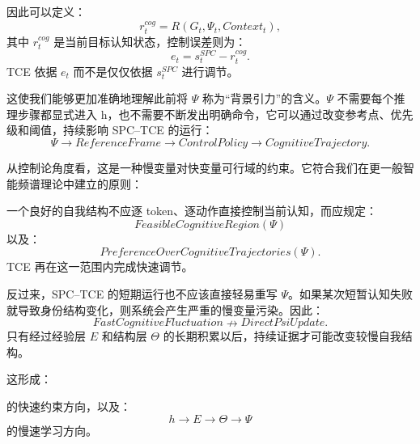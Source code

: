 因此可以定义：
\begin{equation}
r_t^{cog}
=
R
\left(
G_t,\Psi_t,Context_t
\right),
\end{equation}
其中 $r_t^{cog}$ 是当前目标认知状态，控制误差则为：
\begin{equation}
e_t
=
s_t^{SPC}
-
r_t^{cog}.
\end{equation}
TCE 依据 $e_t$ 而不是仅仅依据 $s_t^{SPC}$ 进行调节。

这使我们能够更加准确地理解此前将 $\Psi$ 称为``背景引力''的含义。$\Psi$ 不需要每个推理步骤都显式进入 h，也不需要不断发出明确命令，它可以通过改变参考点、优先级和阈值，持续影响 SPC--TCE 的运行：
\begin{equation}
\Psi
\rightarrow
ReferenceFrame
\rightarrow
ControlPolicy
\rightarrow
CognitiveTrajectory.
\end{equation}

从控制论角度看，这是一种慢变量对快变量可行域的约束。它符合我们在更一般智能频谱理论中建立的原则：
\begin{statementbox}
\centering
{}
\end{statementbox}

一个良好的自我结构不应逐 token、逐动作直接控制当前认知，而应规定：
\begin{equation}
FeasibleCognitiveRegion(\Psi)
\end{equation}
以及：
\begin{equation}
PreferenceOverCognitiveTrajectories(\Psi).
\end{equation}
TCE 再在这一范围内完成快速调节。

反过来，SPC--TCE 的短期运行也不应该直接轻易重写 $\Psi$。如果某次短暂认知失败就导致身份结构变化，则系统会产生严重的慢变量污染。因此：
\begin{equation}
FastCognitiveFluctuation
\nrightarrow
DirectPsiUpdate.
\end{equation}
只有经过经验层 $E$ 和结构层 $\Theta$ 的长期积累以后，持续证据才可能改变较慢自我结构。

这形成：
\begin{statementbox}
\centering
{}
\end{statementbox}
的快速约束方向，以及：
\begin{equation}
\boxed{
h
\rightarrow
E
\rightarrow
\Theta
\rightarrow
\Psi
}
\end{equation}
的慢速学习方向。

